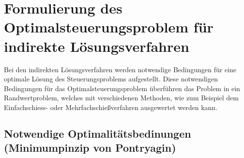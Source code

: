 \chapter{Formulierung des Optimalsteuerungsproblem für indirekte Lösungsverfahren} \label{cha:indirect}

Bei den indirekten Lösungsverfahren werden notwendige Bedingungen für eine optimale Lösung des Steuerungsproblems aufgestellt. Diese notwendigen Bedingungen für das Optimalsteuerungsproblem überführen das Problem in ein  Randwertproblem, welches mit verschiedenen Methoden, wie zum Beispiel dem Einfachschiess- oder Mehrfachschießverfahren ausgewertet werden kann.

\section{Notwendige Optimalitätsbedinungen (Minimumpinzip von Pontryagin)}
%
